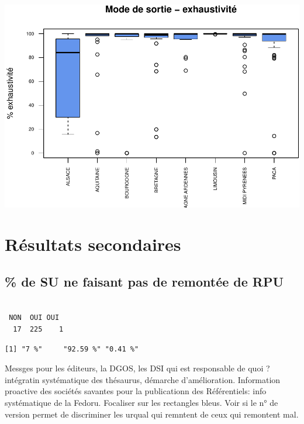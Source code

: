 \documentclass[]{article}
\begin{document}
\includegraphics{septembre2015_files/figure-latex/unnamed-chunk-30-1.pdf}

\section{Résultats secondaires}\label{resultats-secondaires}

\subsection{\% de SU ne faisant pas de remontée de
RPU}\label{de-su-ne-faisant-pas-de-remontee-de-rpu}

\begin{verbatim}

 NON  OUI OUI  
  17  225    1 
\end{verbatim}

\begin{verbatim}
[1] "7 %"     "92.59 %" "0.41 %" 
\end{verbatim}

Messges pour les éditeurs, la DGOS, les DSI qui est responsable de quoi
? intégratin systématique des thésaurus, démarche d'amélioration.
Information proactive des sociétés savantes pour la publicationn des
Référentiels: info systématique de la Fedoru. Focaliser sur les
rectangles bleus. Voir si le n° de version permet de discriminer les
urqual qui remntent de ceux qui remontent mal.
\end{document}
